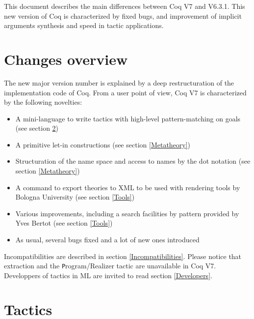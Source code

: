 \documentclass[11pt]{article}
\begin{document}

This document describes the main differences between Coq V7 and
V6.3.1. This new version of Coq is characterized by fixed bugs, and
improvement of implicit arguments synthesis and speed in tactic
applications.

\section{Changes overview}

The new major version number is explained by a deep restructuration of
the implementation code of Coq. From a user point of view, Coq V7 is
characterized by the following novelties:

\begin{itemize}
\item A mini-language to write tactics with high-level
pattern-matching on goals  (see section \ref{Tactics})

\item A primitive let-in constructions (see section \ref{Metatheory})
\item Structuration of the name space and access to names by the dot notation (see section \ref{Metatheory})
\item A command to export theories to XML to be used with rendering
tools by Bologna University (see section \ref{Tools})
\item Various improvements, including a search facilities by pattern
provided by Yves Bertot (see section \ref{Tools})
\item As usual, several bugs fixed and a lot of new ones introduced
\end{itemize}

Incompatibilities are described in section
\ref{Incompatibilities}. Please notice that extraction and the
{\texttt Program/Realizer} tactic are unavailable in Coq V7.
Developpers of tactics in ML are invited to read section
\ref{Developers}.

\section{Tactics}
\label{Tactics}
\def\ltac{{\cal L}_{tac}}
\end{document}
